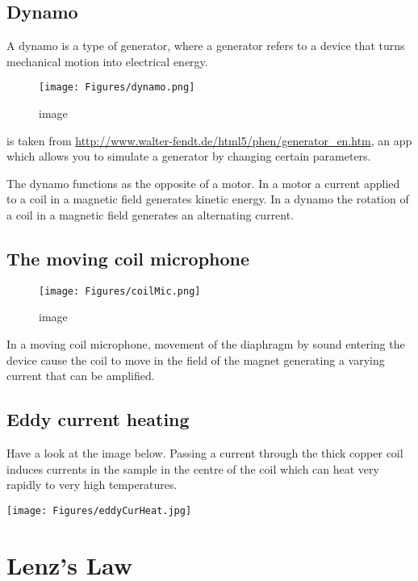 \documentclass[
]{book}
\theoremstyle{definition}
\theoremstyle{definition}
\theoremstyle{definition}
\theoremstyle{definition}
\theoremstyle{remark}
\begin{document}
\hypertarget{dynamo}{%
\subsection{Dynamo}\label{dynamo}}

A dynamo is a type of generator, where a generator refers to a device
that turns mechanical motion into electrical energy.

\begin{figure}
\centering
\texttt{[image: Figures/dynamo.png]}
\caption{image}
\end{figure}

is taken from \url{http://www.walter-fendt.de/html5/phen/generator_en.htm},
an app which allows you to simulate a generator by changing certain
parameters.

The dynamo functions as the opposite of a motor. In a motor a current
applied to a coil in a magnetic field generates kinetic energy. In a
dynamo the rotation of a coil in a magnetic field generates an
alternating current.

\hypertarget{the-moving-coil-microphone}{%
\subsection{The moving coil microphone}\label{the-moving-coil-microphone}}

\begin{figure}
\centering
\texttt{[image: Figures/coilMic.png]}
\caption{image}
\end{figure}

In a moving coil microphone, movement of the diaphragm by sound entering
the device cause the coil to move in the field of the magnet generating
a varying current that can be amplified.

\hypertarget{sec:eddy}{%
\subsection{Eddy current heating}\label{sec:eddy}}

Have a look at the image below. Passing a current through the thick
copper coil induces currents in the sample in the centre of the coil
which can heat very rapidly to very high temperatures.

\texttt{[image: Figures/eddyCurHeat.jpg]} \protect\hypertarget{fig:eddyHeat}{}{}

\hypertarget{lenzs-law}{%
\section{Lenz's Law}\label{lenzs-law}}
\end{document}
